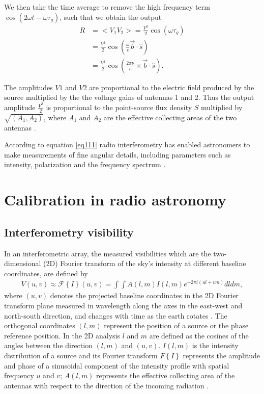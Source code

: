We then take the time average to remove the high frequency term $\cos(2\omega t - \omega \tau_{g})$, such that we obtain the output 
\begin{align}
R&= <V_1V_2> = \frac{V^2}{2}  \cos (\omega\tau_{g})\\
  &= \frac{V^2}{2}  \cos \left( \frac{\omega}{c} \overrightarrow{b} \cdot \widehat{s} \right)\\
   &= \frac{V^2}{2}  \cos \left( \frac{2\pi \nu}{c} \times
   \overrightarrow{b} \cdot \widehat{s} \right). 
\end{align}

The amplitudes $V1$ and $V2$ are proportional to the electric field produced by the  source multiplied by the the voltage gains of antennas 1 and 2. Thus the output amplitude $\frac{V^2}{2}$ is proportional to the point-source flux density $S$ multiplied by $\sqrt{(A_1, A_2)}$, where $A_1$ and $A_2$ are the effective collecting areas of the two antennas \citep{NRAO}.

According to equation \ref{eq111} 
radio interferometry has enabled astronomers to make measurements of fine angular  details, including parameters such as intensity, polarization and the frequency spectrum \citep{thompson2001interferometry}.

\section{Calibration in radio astronomy}
\label{Calibr}
\subsection{Interferometry visibility}
In an interferometric array, the measured visibilities  which are the two-dimensional (2D) Fourier transform of the sky's intensity at different baseline coordinates, are defined by
\begin{align}
V(u,v)\approx \mathcal{F}\left\{I\right\}(u,v)=\int \int A(l,m) I (l,m)e^{-2\pi i(ul+vm)} dl dm,
\label{Vis}
\end{align}
where $(u,v)$ denotes the projected baseline coordinates in the 2D Fourier transform plane  measured in wavelength along the axes in the east-west and north-south direction, and changes with time as the earth rotates  \citep{taylor1999synthesis}. The orthogonal coordinates $(l, m)$ represent the position of a source or the phase reference position. In the 2D analysis $l$ and $m$ are defined as the cosines of the  angles between the direction $(l,m)$ and $(u, v)$. $I(l,m)$ is the intensity distribution of a source and its Fourier transform  ${F}\left\{I\right\}$ represents the amplitude and phase of a sinusoidal component of the intensity profile with spatial frequency $u$ and $v$; $A(l, m)$ represents the effective collecting area of the antennas with respect to the direction of the incoming radiation \citep{thompson2001interferometry}.

